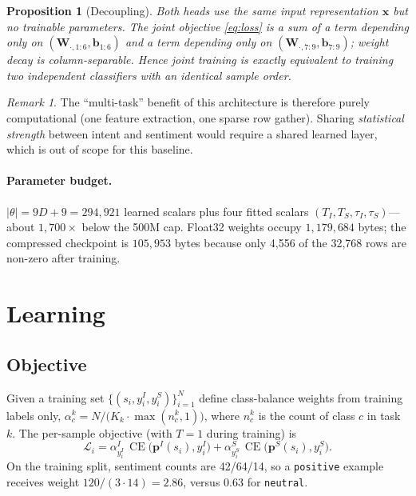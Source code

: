 \documentclass[11pt,a4paper]{article}
\newtheorem{proposition}{Proposition}
\theoremstyle{remark}
\newtheorem*{remark}{Remark}
\newcommand{\lbl}[1]{\texttt{#1}}                      %
\newcommand{\x}{\bm{x}}
\newcommand{\W}{\bm{W}}
\newcommand{\bb}{\bm{b}}
\newcommand{\p}{\bm{p}}
\DeclareMathOperator{\CE}{CE}
\begin{document}
\begin{proposition}[Decoupling]
\label{prop:decouple}
Both heads use the same input representation $\x$ but no trainable parameters.
The joint objective \eqref{eq:loss} is a sum of a term depending only on
$(\W_{\cdot,1:6},\bb_{1:6})$ and a term depending only on
$(\W_{\cdot,7:9},\bb_{7:9})$; weight decay is column-separable. Hence joint
training is exactly equivalent to training two independent classifiers with an
identical sample order.
\end{proposition}

\begin{remark}
The ``multi-task'' benefit of this architecture is therefore purely
computational (one feature extraction, one sparse row gather). Sharing
\emph{statistical strength} between intent and sentiment would require a
shared learned layer, which is out of scope for this baseline.
\end{remark}

\paragraph{Parameter budget.}
$|\theta| = 9D + 9 = 294{,}921$ learned scalars plus four fitted scalars
$(T_I,T_S,\tau_I,\tau_S)$---about $1{,}700\times$ below the 500M cap. Float32
weights occupy $1{,}179{,}684$ bytes; the compressed checkpoint is
$105{,}953$ bytes because only 4{,}556 of the 32{,}768 rows are non-zero after
training.

\section{Learning}
\label{sec:training}

\subsection{Objective}
Given a training set $\{(s_i,y^I_i,y^S_i)\}_{i=1}^{N}$ define class-balance
weights from training labels only,
$\alpha^{k}_{c}=N/\big(K_k\cdot\max(n^{k}_c,1)\big)$, where $n^{k}_c$ is the
count of class $c$ in task $k$. The per-sample objective (with $T=1$ during
training) is
\begin{equation}
  \mathcal{L}_i = \alpha^{I}_{y^I_i}\,\CE\!\big(\p^{I}(s_i),y^I_i\big)
                + \alpha^{S}_{y^S_i}\,\CE\!\big(\p^{S}(s_i),y^S_i\big).
  \label{eq:loss}
\end{equation}
On the training split, sentiment counts are 42/64/14, so a
\lbl{positive} example receives weight $120/(3\cdot14)=2.86$, versus $0.63$
for \lbl{neutral}.
\end{document}
